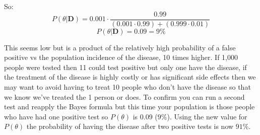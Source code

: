So:
\begin{equation}
    P(\theta | \textbf{D}) = 0.001 \cdot \frac{0.99}{(0.001 \cdot 0.99) + (0.999 \cdot 0.01)}
 \end{equation}
 \begin{equation}
    P(\theta | \textbf{D}) = 0.09 = 9\%
\end{equation}

This seems low but is a product of the relatively high probability of a false positive vs the population incidence of the disease, 10 times higher.  If 1,000 people were tested then 11 could test positive but only one have the disease, if the treatment of the disease is highly costly or has significant side effects then we may want to avoid having to treat 10 people who don't have the disease so that we know we've treated the 1 person or does.  To confirm you can run a second test and reapply the Bayes formula but this time your population is those people who have had one positive test so $P(\theta)$ is 0.09 ($9\%$).  Using the new value for $P(\theta)$ the probability of having the disease after two positive tests is now $91\%$.
